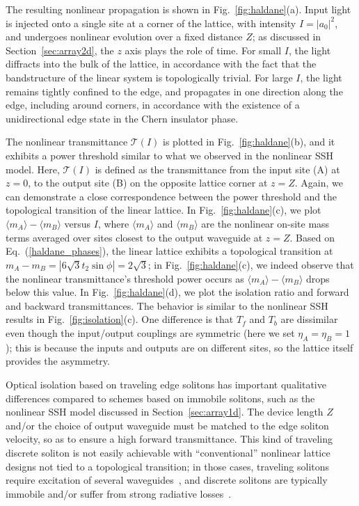 \documentclass[aps,prx,twocolumn,superscriptaddress]{revtex4-1}
\begin{document}
The resulting nonlinear propagation is shown in Fig.~\ref{fig:haldane}(a).  Input light is injected onto a single site at a corner of the lattice, with intensity $I = |a_0|^2$, and undergoes nonlinear evolution over a fixed distance $Z$; as discussed in Section~\ref{sec:array2d}, the $z$ axis plays the role of time.  For small $I$, the light diffracts into the bulk of the lattice, in accordance with the fact that the bandstructure of the linear system is topologically trivial.  For large $I$, the light remains tightly confined to the edge, and propagates in one direction along the edge, including around corners, in accordance with the existence of a unidirectional edge state in the Chern insulator phase.

The nonlinear transmittance $\mathcal{T}(I)$ is plotted in Fig.~\ref{fig:haldane}(b), and it exhibits a power threshold similar to what we observed in the nonlinear SSH model.  Here, $\mathcal{T}(I)$ is defined as the transmittance from the input site (A) at $z = 0$, to the output site (B) on the opposite lattice corner at $z = Z$.  Again, we can demonstrate a close correspondence between the power threshold and the topological transition of the linear lattice.  In Fig.~\ref{fig:haldane}(c), we plot $\langle m_A\rangle - \langle m_B\rangle$ versus $I$, where $\langle m_A\rangle$ and $\langle m_B\rangle$ are the nonlinear on-site mass terms averaged over sites closest to the output waveguide at $z = Z$.  Based on Eq.~(\ref{haldane_phases}), the linear lattice exhibits a topological transition at $m_A - m_B = \left|6\sqrt{3}t_2 \sin\phi\right| = 2\sqrt{3}$; in Fig.~\ref{fig:haldane}(c), we indeed observe that the nonlinear transmittance's threshold power occurs as $\langle m_A\rangle - \langle m_B\rangle$ drops below this value.  In Fig.~\ref{fig:haldane}(d), we plot the isolation ratio and forward and backward transmittances.  The behavior is similar to the nonlinear SSH results in Fig.~\ref{fig:isolation}(c).  One difference is that $T_f$ and $T_b$ are dissimilar even though the input/output couplings are symmetric (here we set $\eta_A = \eta_B = 1$); this is because the inputs and outputs are on different sites, so the lattice itself provides the asymmetry.

Optical isolation based on traveling edge solitons has important qualitative differences compared to schemes based on immobile solitons, such as the nonlinear SSH model discussed in Section~\ref{sec:array1d}.  The device length $Z$ and/or the choice of output waveguide must be matched to the edge soliton velocity, so as to ensure a high forward transmittance. This kind of traveling discrete soliton is not easily achievable with ``conventional'' nonlinear lattice designs not tied to a topological transition; in those cases, traveling solitons require excitation of several waveguides~\cite{Melvin2006}, and discrete solitons are typically immobile and/or suffer from strong radiative losses~\cite{Morandotti1999}.
\end{document}
